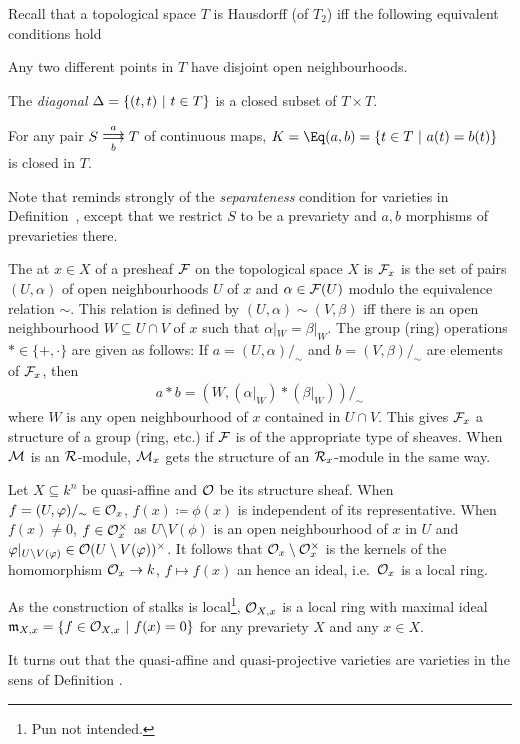 \documentclass[a4paper,parskip=half,numbers=enddot, DIV=12, headheight=30pt]{scrreprt}
\begin{document}
\begin{rem}
    Recall that a topological space $T$ is  Hausdorff (of $T_2$) iff the following equivalent conditions hold
    \begin{alphanumerate}
        \item 
            Any two different points in $T$ have disjoint open neighbourhoods.
        \item 
            The \emph{diagonal} $\Delta = \left\{ (t,t)\ \middle|\  t\in T\right\}$ is a closed subset of $T\times T$.
        \item 
            For any pair $S\doublemorphism[a][\smash{b}] T$ of continuous maps, $K = \Eq(a,b) =\left\{t\in T\st a(t) = b(t)\right\}$ is closed in $T$.
    \end{alphanumerate}
    Note that  reminds strongly of the \emph{separateness} condition for varieties in Definition~, except that we restrict $S$ to be a prevariety and $a,b$ morphisms of prevarieties there.
\end{rem}
\begin{defi}[Stalk]
    The  at $x\in X$ of a presheaf $\mathcal{F}$ on the topological space $X$ is $\mathcal{F}_x$ is the set of pairs $(U,\alpha)$ of open neighbourhoods $U$ of $x$ and $\alpha\in \mathcal{F}(U)$ modulo the equivalence relation $\sim$. This relation is defined by $(U,\alpha)\sim (V, \beta)$ iff there is an open neighbourhood $W\subseteq U\cap V$ of $x$ such that $\alpha|_W = \beta|_W$. The group (ring) operations $*\in \{+,\cdot\}$ are given as follows: If $a= (U,\alpha)/_\sim$ and $b= (V,\beta)/_\sim$ are elements of $\mathcal{F}_x$, then 
    \begin{align*}
        a* b = (W, (\alpha|_W)*(\beta|_W))/_\sim
    \end{align*}
    where $W$ is any open neighbourhood of $x$ contained in $U\cap V$. This gives $\mathcal{F}_x$ a structure of a group (ring, etc.) if $\mathcal{F}$ is of the appropriate type of sheaves. When $\mathcal{M}$ is an $\mathcal{R}$-module, $\mathcal{M}_x$ gets the structure of an $\mathcal{R}_x$-module in the same way.
\end{defi}
\begin{rem}
    Let $X\subseteq k^n$ be quasi-affine and $\mathcal{O}$ be its structure sheaf. When $f=(U,\varphi)/_\sim\in \mathcal{O}_x$, $f(x)\coloneqq \phi(x)$ is independent of its representative. When $f(x)\neq 0$, $f\in \mathcal{O}_x^\times$ as $U\setminus V(\phi)$ is an open neighbourhood of $x$ in $U$ and $\varphi|_{U\setminus V(\varphi)} \in \mathcal{O}(U\setminus V(\varphi))^\times$. It follows that $\mathcal{O}_x\setminus\mathcal{O}_x^\times$ is the kernels of the homomorphism $\Oo_x \morphism k$, $f\mapsto f(x)$ an hence an ideal, i.e.\ $\mathcal{O}_x$ is a local ring. 
    
    As the construction of stalks is local\footnote{Pun not intended.}, $\mathcal{O}_{X,x}$ is a local ring with maximal ideal $\mathfrak{m}_{X,x} = \left\{f\in \mathcal{O}_{X,x}\ \middle|\  f(x) = 0\right\}$ for any prevariety $X$ and any $x\in X$. 
\end{rem}
\begin{rem}
    It turns out that the quasi-affine and quasi-projective varieties are varieties in the sens of Definition .
\end{rem}
\printbibliography
\end{document}
